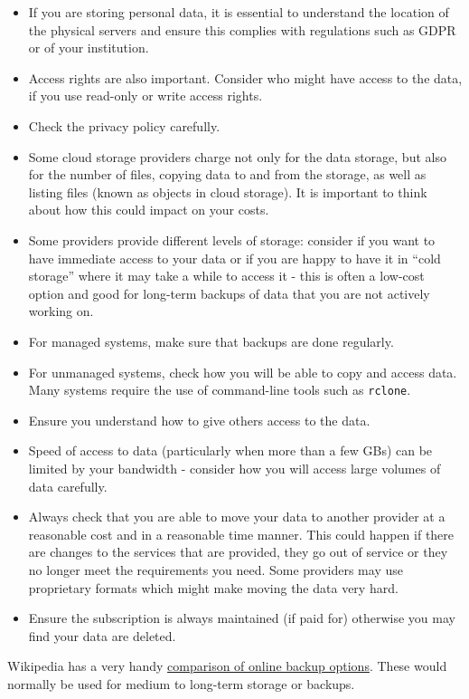 \documentclass[a4paper,oneside]{report}
\providecommand{\tightlist}{%
  \setlength{\itemsep}{0pt}\setlength{\parskip}{0pt}}
\begin{document}
\begin{itemize}
\tightlist
\item
  If you are storing personal data, it is essential to understand the
  location of the physical servers and ensure this complies with
  regulations such as GDPR or of your institution.
\item
  Access rights are also important. Consider who might have access to
  the data, if you use read-only or write access rights.
\item
  Check the privacy policy carefully.
\item
  Some cloud storage providers charge not only for the data storage, but
  also for the number of files, copying data to and from the storage, as
  well as listing files (known as objects in cloud storage). It is
  important to think about how this could impact on your costs.
\item
  Some providers provide different levels of storage: consider if you
  want to have immediate access to your data or if you are happy to have
  it in ``cold storage'' where it may take a while to access it - this
  is often a low-cost option and good for long-term backups of data that
  you are not actively working on.
\item
  For managed systems, make sure that backups are done regularly.
\item
  For unmanaged systems, check how you will be able to copy and access
  data. Many systems require the use of command-line tools such as
  \texttt{rclone}.
\item
  Ensure you understand how to give others access to the data.
\item
  Speed of access to data (particularly when more than a few GBs) can be
  limited by your bandwidth - consider how you will access large volumes
  of data carefully.
\item
  Always check that you are able to move your data to another provider
  at a reasonable cost and in a reasonable time manner. This could
  happen if there are changes to the services that are provided, they go
  out of service or they no longer meet the requirements you need. Some
  providers may use proprietary formats which might make moving the data
  very hard.
\item
  Ensure the subscription is always maintained (if paid for) otherwise
  you may find your data are deleted.
\end{itemize}

Wikipedia has a very handy
\href{https://en.wikipedia.org/wiki/Comparison_of_online_backup_services}{comparison
of online backup options}. These would normally be used for medium to
long-term storage or backups.
\end{document}
